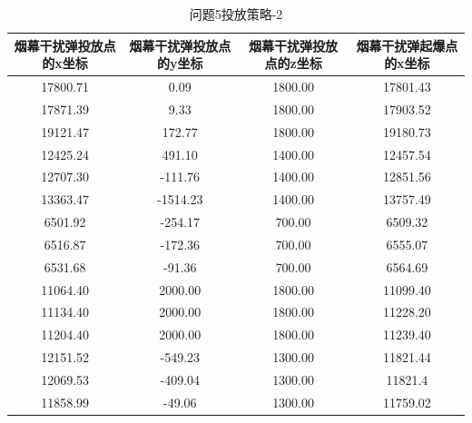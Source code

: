 \documentclass[../main.tex]{subfiles}
\begin{document}
\begin{table}[H]
\caption{问题5投放策略-2}
\label{tab:031} 
\centering
\begin{small}
\begin{tabular}{cccc}
\toprule[1.5pt]
烟幕干扰弹投放点的x坐标& 烟幕干扰弹投放点的y坐标    &烟幕干扰弹投放点的z坐标 & 烟幕干扰弹起爆点的x坐标\\
\midrule[1pt]
    17800.71 & 0.09    & 1800.00 & 17801.43 \\
    17871.39 & 9.33    & 1800.00 & 17903.52 \\
    19121.47 & 172.77  & 1800.00 & 19180.73 \\
    12425.24 & 491.10  & 1400.00 & 12457.54 \\
    12707.30 & -111.76 & 1400.00 & 12851.56 \\
    13363.47 & -1514.23& 1400.00 & 13757.49 \\
    6501.92  & -254.17 & 700.00  & 6509.32 \\
    6516.87  & -172.36 & 700.00  & 6555.07 \\
    6531.68  & -91.36  & 700.00  & 6564.69 \\
    11064.40 & 2000.00 & 1800.00 & 11099.40 \\
    11134.40 & 2000.00 & 1800.00 & 11228.20 \\
    11204.40 & 2000.00 & 1800.00 & 11239.40 \\
    12151.52 & -549.23 & 1300.00 & 11821.44 \\
    12069.53 & -409.04 & 1300.00 & 11821.4 \\
    11858.99 & -49.06  & 1300.00 & 11759.02 \\
\bottomrule[1.5pt]
\end{tabular}
\end{small}
\end{table}
\end{document}
